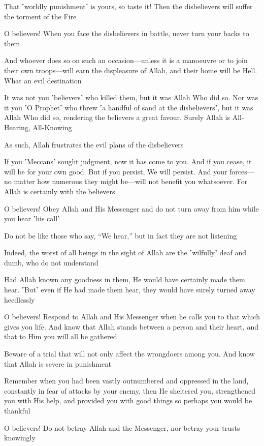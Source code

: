 That ˹worldly punishment˺ is yours, so taste it! Then the disbelievers will suffer the torment of the Fire

O believers! When you face the disbelievers in battle, never turn your backs to them

And whoever does so on such an occasion—unless it is a manoeuvre or to join their own troops—will earn the displeasure of Allah, and their home will be Hell. What an evil destination

It was not you ˹believers˺ who killed them, but it was Allah Who did so. Nor was it you ˹O Prophet˺ who threw ˹a handful of sand at the disbelievers˺, but it was Allah Who did so, rendering the believers a great favour. Surely Allah is All-Hearing, All-Knowing

As such, Allah frustrates the evil plans of the disbelievers

If you ˹Meccans˺ sought judgment, now it has come to you. And if you cease, it will be for your own good. But if you persist, We will persist. And your forces—no matter how numerous they might be—will not benefit you whatsoever. For Allah is certainly with the believers

O believers! Obey Allah and His Messenger and do not turn away from him while you hear ˹his call˺

Do not be like those who say, “We hear,” but in fact they are not listening

Indeed, the worst of all beings in the sight of Allah are the ˹wilfully˺ deaf and dumb, who do not understand

Had Allah known any goodness in them, He would have certainly made them hear. ˹But˺ even if He had made them hear, they would have surely turned away heedlessly

O believers! Respond to Allah and His Messenger when he calls you to that which gives you life. And know that Allah stands between a person and their heart, and that to Him you will all be gathered

Beware of a trial that will not only affect the wrongdoers among you. And know that Allah is severe in punishment

Remember when you had been vastly outnumbered and oppressed in the land, constantly in fear of attacks by your enemy, then He sheltered you, strengthened you with His help, and provided you with good things so perhaps you would be thankful

O believers! Do not betray Allah and the Messenger, nor betray your trusts knowingly

